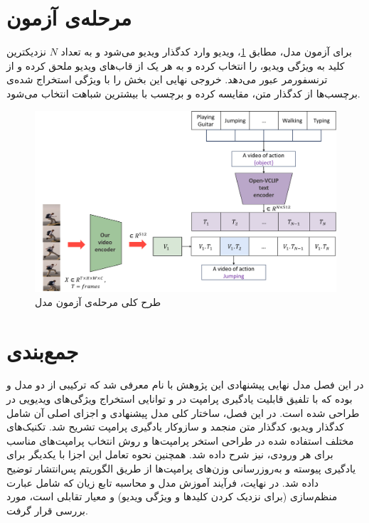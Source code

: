 \section{مرحله‌ی آزمون }
برای آزمون مدل، مطابق \cref{fig.35}، ویدیو وارد کدگذار ویدیو می‌شود و به تعداد $N$ نزدیکترین کلید به ویژگی ویدیو، را انتخاب کرده و به هر یک از قاب‌های ویدیو ملحق کرده و از ترنسفورمر عبور می‌دهد. خروجی نهایی این بخش را با ویژگی استخراج شده‌ی برچسب‌ها از کدگذار متن، مقایسه کرده و برچسب با بیشترین شباهت انتخاب می‌شود.
‌\begin{figure}
	\centering\includegraphics[scale=.48]{Images/Chapter3/test_phase.png}
	\caption[]{طرح کلی مرحله‌ی آزمون مدل }
	\label{fig.35}
\end{figure}
\section{جمع‌بندی}
در این فصل مدل نهایی پیشنهادی این پژوهش با نام  معرفی شد که ترکیبی از دو مدل  و  بوده که با تلفیق قابلیت یادگیری پرامپت در  و توانایی استخراج ویژگی‌های ویدیویی در  طراحی شده است. در این فصل، ساختار کلی مدل پیشنهادی و اجزای اصلی آن شامل کدگذار ویدیو، کدگذار متن منجمد و سازوکار یادگیری پرامپت تشریح شد. تکنیک‌های مختلف استفاده شده در طراحی استخر پرامپت‌ها و روش انتخاب پرامپت‌های مناسب برای هر ورودی، نیز شرح داده شد. همچنین نحوه تعامل این اجزا با یکدیگر برای یادگیری پیوسته و به‌روزرسانی وزن‌های پرامپت‌ها از طریق الگوریتم پس‌انتشار توضیح داده شد. در نهایت، فرآیند آموزش مدل و محاسبه تابع زیان که شامل عبارت منظم‌سازی (برای نزدیک کردن کلیدها و ویژگی ویدیو) و معیار تقابلی است، مورد بررسی قرار گرفت.


